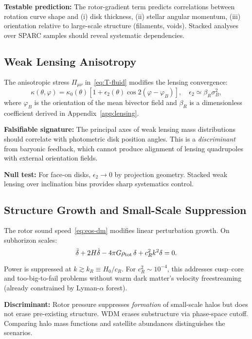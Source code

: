 \documentclass[11pt,a4paper]{article}
\numberwithin{equation}{section}
\theoremstyle{plain}
\theoremstyle{definition}
\theoremstyle{remark}
\begin{document}
\textbf{Testable prediction:} The rotor-gradient term predicts correlations between rotation curve shape and (i) disk thickness, (ii) stellar angular momentum, (iii) orientation relative to large-scale structure (filaments, voids). Stacked analyses over SPARC samples should reveal systematic dependencies.

\subsection{Weak Lensing Anisotropy}

The anisotropic stress $\Pi_{\mu\nu}$ in~\eqref{eq:T-fluid} modifies the lensing convergence:
\begin{equation}
\kappa(\theta,\varphi)=\kappa_0(\theta)\left[1+\epsilon_2(\theta)\cos 2(\varphi-\varphi_B)\right],\quad
\epsilon_2\simeq \beta_R\sigma_B^2,
\label{eq:kappa-quad}
\end{equation}
where $\varphi_B$ is the orientation of the mean bivector field and $\beta_R$ is a dimensionless coefficient derived in Appendix~\ref{app:lensing}.

\textbf{Falsifiable signature:} The principal axes of weak lensing mass distributions should correlate with photometric disk position angles. This is a \emph{discriminant} from baryonic feedback, which cannot produce alignment of lensing quadrupoles with external orientation fields.

\textbf{Null test:} For face-on disks, $\epsilon_2\to 0$ by projection geometry. Stacked weak lensing over inclination bins provides sharp systematics control.

\subsection{Structure Growth and Small-Scale Suppression}

The rotor sound speed~\eqref{eq:eos-dm} modifies linear perturbation growth. On subhorizon scales:
\begin{equation}
\ddot\delta + 2H\dot\delta - 4\pi G \rho_{\rm tot}\,\delta + c_R^2 k^2 \delta = 0.
\label{eq:pert-growth}
\end{equation}

Power is suppressed at $k\gtrsim k_R\equiv H_0/c_R$. For $c_R^2\sim 10^{-4}$, this addresses cusp--core and too-big-to-fail problems without warm dark matter's velocity freestreaming (already constrained by Lyman-$\alpha$ forest).

\textbf{Discriminant:} Rotor pressure suppresses \emph{formation} of small-scale halos but does not erase pre-existing structure. WDM erases substructure via phase-space cutoff. Comparing halo mass functions and satellite abundances distinguishes the scenarios.
\end{document}

